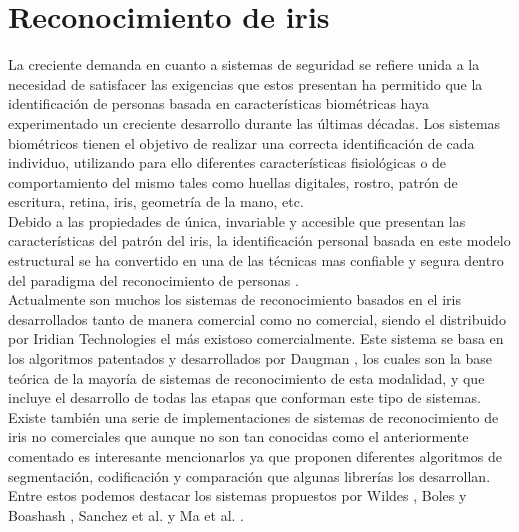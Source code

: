 
\chapter{Reconocimiento de iris} %

\label{Capítulo 2} %




La creciente demanda en cuanto a sistemas de seguridad se refiere unida a la necesidad de satisfacer las exigencias que estos presentan ha permitido que la identificación de personas basada en características biométricas haya experimentado un creciente desarrollo durante las últimas décadas. Los sistemas biométricos tienen el objetivo de realizar una correcta identificación de cada individuo, utilizando para ello diferentes características fisiológicas o de comportamiento del mismo tales como huellas digitales, rostro, patrón de escritura, retina, iris, geometría de la mano, etc. \\

Debido a las propiedades de única, invariable y accesible que presentan las características del patrón del iris, la identificación personal basada en este modelo estructural se ha convertido en una de las técnicas mas confiable y segura dentro del paradigma del reconocimiento de personas\cite{Reference1} \cite{Reference2} \cite{Reference3} \cite{Reference4} \cite{Reference5}. \\

Actualmente son muchos los sistemas de reconocimiento basados en el iris desarrollados tanto de manera comercial como no comercial, siendo el distribuido por Iridian Technologies \cite{Reference6} el más existoso comercialmente. Este sistema se basa en los algoritmos patentados y desarrollados por Daugman \cite{Reference1}, los cuales son la base teórica de la mayoría de sistemas de reconocimiento de esta modalidad, y que incluye el desarrollo de todas las etapas que conforman este tipo de sistemas. Existe también una serie de implementaciones de sistemas de reconocimiento de iris no comerciales que aunque no son tan conocidas como el anteriormente comentado es interesante mencionarlos ya que proponen diferentes algoritmos de segmentación, codificación y comparación que algunas librerías los desarrollan. Entre estos podemos destacar los sistemas propuestos por Wildes \cite{Reference4} , Boles y Boashash \cite{Reference2}, Sanchez et al. \cite{Reference7} y Ma et al. \cite{Reference3}.  \\ 


